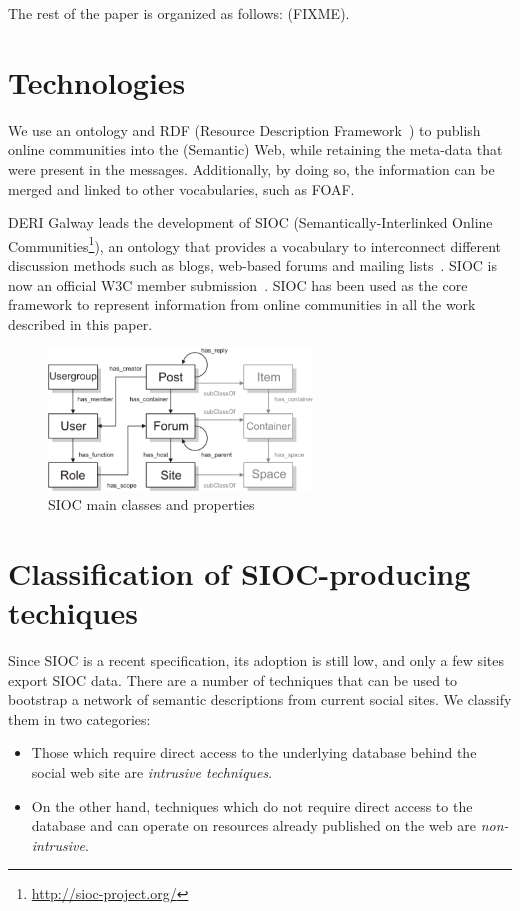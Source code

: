 \documentclass{../templates/www2008-submission}
\begin{document}
The rest of the paper is organized as follows: (FIXME).

\section{Technologies}

We use an ontology and RDF (Resource Description
Framework~\cite{RDF}) to publish online communities into 
the (Semantic) Web, while retaining the meta-data that were present in 
the messages. Additionally, by doing so, the information can be
merged and linked to other vocabularies, such as FOAF.

DERI Galway leads the development of SIOC (Semantically-Interlinked Online
Communities\footnote{\url{http://sioc-project.org/}}), an ontology that 
provides a vocabulary to interconnect different discussion methods such 
as blogs, web-based forums and mailing lists~\cite{Breslin2006,Breslin2005}.
SIOC is now an official W3C member submission~\cite{Bojars2007}.
SIOC has been used as the core framework to represent information from
online communities in all the work described in this paper.

\begin{figure}[ht]
 \centering
 \includegraphics[width=7cm]{images/sioc.png}
 \caption{SIOC main classes and properties}
\end{figure}

\section{Classification of SIOC-producing techiques}

Since SIOC is a recent specification, its adoption is still low, and
only a few sites export SIOC data. There are a number of techniques
that can be used to bootstrap a network of semantic descriptions from
current social sites. We classify them in two categories:

\begin{itemize}
\item Those which require direct access to the underlying database behind
the social web site are \emph{intrusive techniques}.
\item On the other hand, techniques which do not require direct access to
the database and can operate on resources already published on the web
are \emph{non-intrusive}.
\end{itemize}
\end{document}
